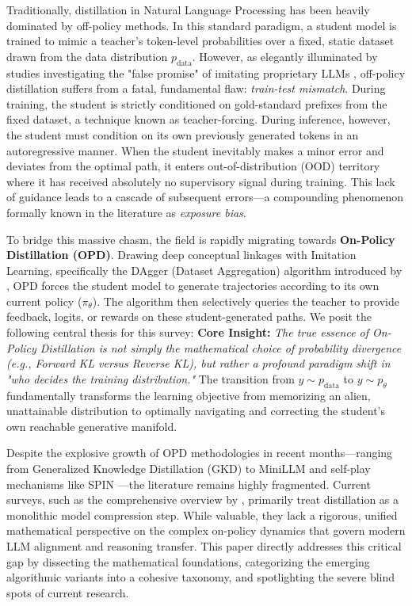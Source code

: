 \documentclass{article} %
\newcommand{\ptheta}{p_\theta}
\newcommand{\pdata}{p_{\mathrm{data}}}
\begin{document}
Traditionally, distillation in Natural Language Processing has been heavily dominated by off-policy methods. In this standard paradigm, a student model is trained to mimic a teacher's token-level probabilities over a fixed, static dataset drawn from the data distribution $\pdata$. However, as elegantly illuminated by studies investigating the "false promise" of imitating proprietary LLMs \citep{2305.15717}, off-policy distillation suffers from a fatal, fundamental flaw: \textit{train-test mismatch}. During training, the student is strictly conditioned on gold-standard prefixes from the fixed dataset, a technique known as teacher-forcing. During inference, however, the student must condition on its own previously generated tokens in an autoregressive manner. When the student inevitably makes a minor error and deviates from the optimal path, it enters out-of-distribution (OOD) territory where it has received absolutely no supervisory signal during training. This lack of guidance leads to a cascade of subsequent errors—a compounding phenomenon formally known in the literature as \textit{exposure bias}. 

To bridge this massive chasm, the field is rapidly migrating towards \textbf{On-Policy Distillation (OPD)}. Drawing deep conceptual linkages with Imitation Learning, specifically the DAgger (Dataset Aggregation) algorithm introduced by \citet{ross2011reduction}, OPD forces the student model to generate trajectories according to its own current policy ($\pi_\theta$). The algorithm then selectively queries the teacher to provide feedback, logits, or rewards on these student-generated paths. We posit the following central thesis for this survey:
\textbf{Core Insight:} \textit{The true essence of On-Policy Distillation is not simply the mathematical choice of probability divergence (e.g., Forward KL versus Reverse KL), but rather a profound paradigm shift in "who decides the training distribution."} The transition from $y \sim \pdata$ to $y \sim \ptheta$ fundamentally transforms the learning objective from memorizing an alien, unattainable distribution to optimally navigating and correcting the student's own reachable generative manifold.

Despite the explosive growth of OPD methodologies in recent months—ranging from Generalized Knowledge Distillation (GKD) \citep{2306.13649} to MiniLLM \citep{2306.08543} and self-play mechanisms like SPIN \citep{2401.01335}—the literature remains highly fragmented. Current surveys, such as the comprehensive overview by \citet{2402.13116}, primarily treat distillation as a monolithic model compression step. While valuable, they lack a rigorous, unified mathematical perspective on the complex on-policy dynamics that govern modern LLM alignment and reasoning transfer. This paper directly addresses this critical gap by dissecting the mathematical foundations, categorizing the emerging algorithmic variants into a cohesive taxonomy, and spotlighting the severe blind spots of current research.
\end{document}
